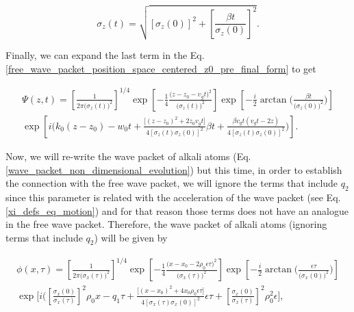 \documentclass{article}
\begin{document}
\begin{equation}\label{free_wave_packet_width} 
\sigma_{z}(t) = \sqrt{[\sigma_{z}(0)]^{2} + \left[\frac{\beta t}{\sigma_{z}(0)} \right]^{2}}.
\end{equation}

Finally, we can expand the last term in the Eq. \ref{free_wave_packet_position_space_centered_z0_pre_final_form} to get

\begin{multline}\label{free_wave_packet_position_space_centered_z0_final_form} 
    \Psi (z, t) = \left[\frac{1}{2 \pi \big(\sigma_{z}(t)\big)^2} \right]^{1/4} \exp \left[-\frac{1}{4} \frac{ \big(z - z_{0} - \upsilon_{g} t \big)^{2}}{\big(\sigma_{z}(t)\big)^{2}} \right] \exp \left[-\frac{i}{2} \arctan\Bigg(\frac{\beta t }{\big(\sigma_{z}(0)\big)^{2}}\Bigg) \right] \\ \exp \left[i \Bigg(k_{0}(z-z_{0}) - w_{0}t + \frac{ \big[(z - z_{0} )^{2} + 2 z_{0} v_{g} t \big]}{ 4[\sigma_{z}(t)\sigma_{z}(0)]^{2}}\beta t + \frac{\beta v_{g} t (v_{g} t - 2z)}{4[\sigma_{z}(t)\sigma_{z}(0)]^{2}} \Bigg) \right].
\end{multline}

Now, we will re-write the wave packet of alkali atoms (Eq. \ref{wave_packet_non_dimensional_evolution}) but this time, in order to establish the connection with the free wave packet, we will ignore the terms that include $q_{2}$ since this parameter is related with the acceleration of the wave packet (see Eq. \ref{xi_defs_eq_motion}) and for that reason those terms does not have an analogue in the free wave packet. Therefore, the wave packet of alkali atoms (ignoring terms that include $q_{2}$) will be given by

\begin{multline}\label{alkali_wave_packet_position_space_final_form} 
    \phi (x, \tau) = \left[\frac{1}{2 \pi \big(\sigma_{x}(\tau)\big)^2} \right]^{1/4} \exp \left[-\frac{1}{4} \frac{ \big(x - x_{0} - 2\rho_{0} \epsilon \tau \big)^{2}}{\big(\sigma_{x}(\tau)\big)^{2}} \right] \exp \left[-\frac{i}{2} \arctan\Bigg(\frac{\epsilon \tau}{\big(\sigma_{x}(0)\big)^{2}}\Bigg) \right] \\ \exp \Bigg[i \bigg(\left[\frac{\sigma_{x}(0)}{\sigma_{x}(\tau)} \right]^{2} \rho_{0}x - q_{1}\tau + \frac{\big[(x-x_{0})^{2} + 4 x_{0} \rho_{0} \epsilon \tau \big]}{ 4[\sigma_{x}(\tau)\sigma_{x}(0)]^{2}} \epsilon \tau + \left[\frac{\sigma_{x}(0)}{\sigma_{x}(\tau)} \right]^{2} \rho_{0}^{2} \epsilon \Bigg],
\end{multline}
\end{document}
